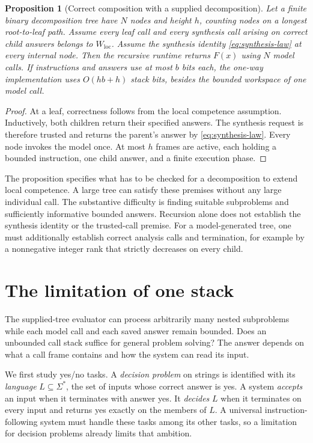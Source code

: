 \documentclass[11pt,twoside]{article}
\newtheorem{proposition}[theorem]{Proposition}
\theoremstyle{definition}
\theoremstyle{remark}
\begin{document}
\begin{proposition}[Correct composition with a supplied decomposition]
\label{prop:composition}
Let a finite binary decomposition tree have $N$ nodes and height $h$,
counting nodes on a longest root-to-leaf path. Assume every leaf call and
every synthesis call arising on correct child answers belongs to
$W_{\mathrm{loc}}$. Assume the synthesis identity
\eqref{eq:synthesis-law} at every internal node. Then the recursive runtime
returns $F(x)$ using $N$ model calls. If instructions and answers use at most
$b$ bits each, the one-way implementation uses $O(hb+h)$ stack bits, besides
the bounded workspace of one model call.
\end{proposition}
\begin{proof}
At a leaf, correctness follows from the local competence assumption.
Inductively, both children return their specified answers. The synthesis
request is therefore trusted and returns the parent's answer by
\eqref{eq:synthesis-law}. Every node invokes the model once. At most $h$
frames are active, each holding a bounded instruction, one child answer,
and a finite execution phase.
\end{proof}

The proposition specifies what has to be checked for a decomposition to
extend local competence. A large tree can satisfy these premises without
any large individual call. The substantive difficulty is finding suitable
subproblems and sufficiently informative bounded answers. Recursion alone
does not establish the synthesis identity or the trusted-call premise.
For a model-generated tree, one must additionally establish correct
analysis calls and termination, for example by a nonnegative integer rank
that strictly decreases on every child.

\section{The limitation of one stack}
\label{sec:stack}

The supplied-tree evaluator can process arbitrarily many nested subproblems
while each model call and each saved answer remain bounded. Does an
unbounded call stack suffice for general problem solving? The answer depends
on what a call frame contains and how the system can read its input.

We first study yes/no tasks. A \emph{decision problem} on strings is
identified with its \emph{language} $L\subseteq\Sigma^*$, the set of inputs
whose correct answer is yes. A system \emph{accepts} an input when it
terminates with answer yes. It \emph{decides} $L$ when it terminates
on every input and returns yes exactly on the members of $L$. A universal
instruction-following system must handle these tasks among its other tasks,
so a limitation for decision problems already limits that ambition.
\end{document}
